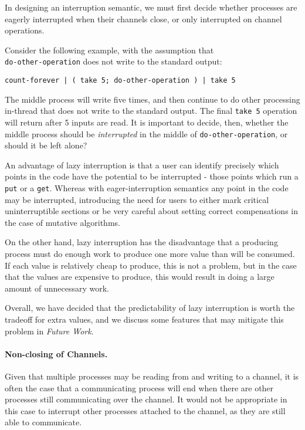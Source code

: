 \documentclass[format=sigconf, review=true, draft=true, screen=true]{acmart}
\begin{document}
In designing an interruption semantic, we must first decide whether processes are eagerly interrupted when their channels close, or only interrupted on channel operations.

Consider the following example, with the assumption that \\ \verb/do-other-operation/ does not write to the standard output:

\begin{verbatim}
count-forever | ( take 5; do-other-operation ) | take 5
\end{verbatim}

The middle process will write five times, and then continue to do other processing in-thread that does not write to the standard output.
The final \verb/take 5/ operation will return after 5 inputs are read.
It is important to decide, then, whether the middle process should be \emph{interrupted} in the middle of \verb/do-other-operation/, or should it be left alone?

An advantage of lazy interruption is that a user can identify precisely which points in the code have the potential to be interrupted - those points which run a \verb/put/ or a \verb/get/. Whereas with eager-interruption semantics any point in the code may be interrupted, introducing the need for users to either mark critical uninterruptible sections or be very careful about setting correct compensations in the case of mutative algorithms.

On the other hand, lazy interruption has the disadvantage that a producing process must do enough work to produce one more value than will be consumed. If each value is relatively cheap to produce, this is not a problem, but in the case that the values are expensive to produce, this would result in doing a large amount of unnecessary work.

Overall, we have decided that the predictability of lazy interruption is worth the tradeoff for extra values, and we discuss some features that may mitigate this problem in \emph{Future Work}.

\paragraph{Non-closing of Channels.}

Given that multiple processes may be reading from and writing to a channel, it is often the case that a communicating process will end when there are other processes still communicating over the channel. It would not be appropriate in this case to interrupt other processes attached to the channel, as they are still able to communicate.
\end{document}
